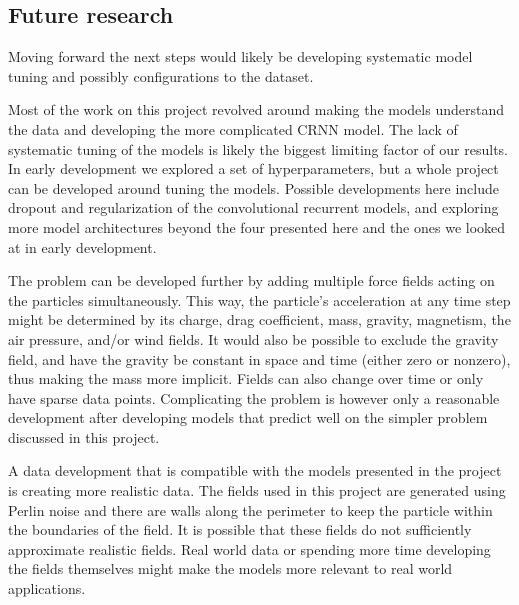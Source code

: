 \documentclass[a4paper]{article}
\begin{document}
\subsection{Future research}
Moving forward the next steps would likely be developing systematic model tuning and possibly configurations to the dataset. 

Most of the work on this project revolved around making the models understand the data and developing the more complicated CRNN model. The lack of systematic tuning of the models is likely the biggest limiting factor of our results. In early development we explored a set of hyperparameters, but a whole project can be developed around tuning the models. Possible developments here include dropout and regularization of the convolutional recurrent models, and exploring more model architectures beyond the four presented here and the ones we looked at in early development. 

The problem can be developed further by adding multiple force fields acting on the particles simultaneously. This way, the particle's acceleration at any time step might be determined by its charge, drag coefficient, mass, gravity, magnetism, the air pressure, and/or wind fields. It would also be possible to exclude the gravity field, and have the gravity be constant in space and time (either zero or nonzero), thus making the mass more implicit. Fields can also change over time or only have sparse data points. Complicating the problem is however only a reasonable development after developing models that predict well on the simpler problem discussed in this project.

A data development that is compatible with the models presented in the project is creating more realistic data. The fields used in this project are generated using Perlin noise and there are walls along the perimeter to keep the particle within the boundaries of the field. It is possible that these fields do not sufficiently approximate realistic fields. Real world data or spending more time developing the fields themselves might make the models more relevant to real world applications.



\printbibliography
\end{document}
